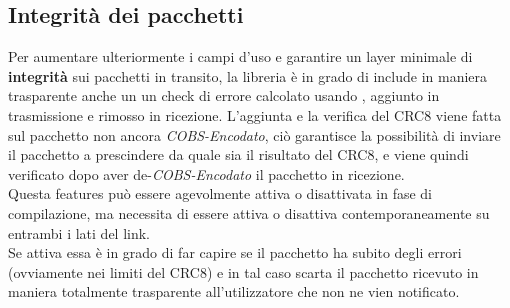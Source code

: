 
\subsection{Integrità dei pacchetti}\vspace{-2mm}
Per aumentare ulteriormente i campi d’uso e garantire un layer minimale di \textbf{integrità} sui pacchetti in transito, la libreria è in grado di include in maniera trasparente anche un un check di errore calcolato usando \cite{CRC8}, aggiunto in trasmissione e rimosso in ricezione. L'aggiunta e la verifica del CRC8 viene fatta sul pacchetto non ancora \textit{COBS-Encodato}, ciò garantisce la possibilità di inviare il pacchetto a prescindere da quale sia il risultato del CRC8, e viene quindi verificato dopo aver de-\textit{COBS-Encodato} il pacchetto in ricezione.\\
Questa features può essere agevolmente attiva o disattivata in fase di compilazione, ma necessita di essere attiva o disattiva contemporaneamente su entrambi i lati del link.\\
Se attiva essa è in grado di far capire se il pacchetto ha subito degli errori (ovviamente nei limiti del CRC8) e in tal caso scarta il pacchetto ricevuto in maniera totalmente trasparente all'utilizzatore che non ne vien notificato.\\

\newpage
